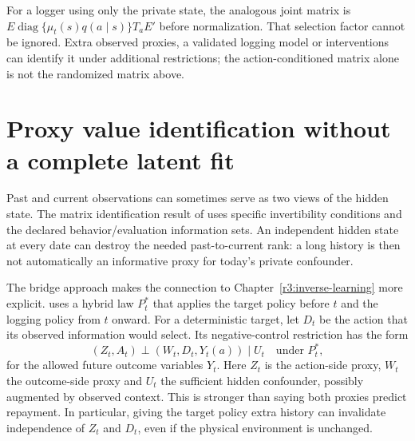 For a logger using only the private state, the analogous joint matrix is
$E\operatorname{diag}\{\mu_t(s)q(a\mid s)\}T_aE'$ before
normalization. That selection factor cannot be ignored. Extra observed
proxies, a validated logging model or interventions can identify it
under additional restrictions; the action-conditioned matrix alone is
not the randomized matrix above.

\section{Proxy value identification without a complete latent fit}
\label{r3:sequential-proxies}
Past and current observations can sometimes serve as two views of the
hidden state. The matrix identification result of
\citet[Section 3, Theorem 1]{tennenholtz2020} uses specific
invertibility conditions and the declared behavior/evaluation information
sets. An independent hidden state at every date can destroy the needed
past-to-current rank: a long history is then not automatically an
informative proxy for today's private confounder.

The bridge approach makes the connection to
Chapter~\ref{r3:inverse-learning} more explicit.
\citet[Section 4, Assumptions 1--2 and Theorem 2]{bennettprox2023}
uses a hybrid law $P_t^*$ that applies the target policy before $t$
and the logging policy from $t$ onward. For a deterministic target,
let $D_t$ be the action that its observed information would select.
Its negative-control restriction has the form
\[
 (Z_t,A_t)\perp(W_t,D_t,Y_t(a))\mid U_t
 \quad\text{under }P_t^*,
\]
for the allowed future outcome variables $Y_t$. Here $Z_t$ is the
action-side proxy, $W_t$ the outcome-side proxy and $U_t$ the sufficient
hidden confounder, possibly augmented by observed context. This is
stronger than saying both proxies predict repayment. In particular,
giving the target policy extra history can invalidate independence of
$Z_t$ and $D_t$, even if the physical environment is unchanged.

